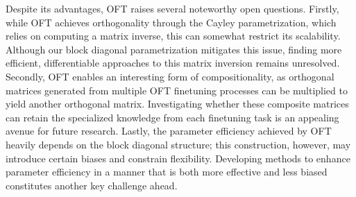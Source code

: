 Despite its advantages, OFT raises several noteworthy open questions. Firstly, while OFT achieves orthogonality through the Cayley parametrization, which relies on computing a matrix inverse, this can somewhat restrict its scalability. Although our block diagonal parametrization mitigates this issue, finding more efficient, differentiable approaches to this matrix inversion remains unresolved. Secondly, OFT enables an interesting form of compositionality, as orthogonal matrices generated from multiple OFT finetuning processes can be multiplied to yield another orthogonal matrix. Investigating whether these composite matrices can retain the specialized knowledge from each finetuning task is an appealing avenue for future research. Lastly, the parameter efficiency achieved by OFT heavily depends on the block diagonal structure; this construction, however, may introduce certain biases and constrain flexibility. Developing methods to enhance parameter efficiency in a manner that is both more effective and less biased constitutes another key challenge ahead.